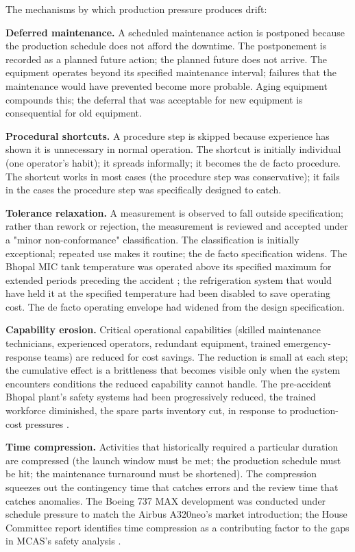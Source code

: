The mechanisms by which production pressure produces drift:

\textbf{Deferred maintenance.} A scheduled maintenance action is postponed because the production schedule does not afford the downtime. The postponement is recorded as a planned future action; the planned future does not arrive. The equipment operates beyond its specified maintenance interval; failures that the maintenance would have prevented become more probable. Aging equipment compounds this; the deferral that was acceptable for new equipment is consequential for old equipment.

\textbf{Procedural shortcuts.} A procedure step is skipped because experience has shown it is unnecessary in normal operation. The shortcut is initially individual (one operator's habit); it spreads informally; it becomes the de facto procedure. The shortcut works in most cases (the procedure step was conservative); it fails in the cases the procedure step was specifically designed to catch.

\textbf{Tolerance relaxation.} A measurement is observed to fall outside specification; rather than rework or rejection, the measurement is reviewed and accepted under a "minor non-conformance" classification. The classification is initially exceptional; repeated use makes it routine; the de facto specification widens. The Bhopal MIC tank temperature was operated above its specified maximum for extended periods preceding the accident \cite{acc:icmr-bhopal-2004}; the refrigeration system that would have held it at the specified temperature had been disabled to save operating cost. The de facto operating envelope had widened from the design specification.

\textbf{Capability erosion.} Critical operational capabilities (skilled maintenance technicians, experienced operators, redundant equipment, trained emergency-response teams) are reduced for cost savings. The reduction is small at each step; the cumulative effect is a brittleness that becomes visible only when the system encounters conditions the reduced capability cannot handle. The pre-accident Bhopal plant's safety systems had been progressively reduced, the trained workforce diminished, the spare parts inventory cut, in response to production-cost pressures \cite{acc:icmr-bhopal-2004}.

\textbf{Time compression.} Activities that historically required a particular duration are compressed (the launch window must be met; the production schedule must be hit; the maintenance turnaround must be shortened). The compression squeezes out the contingency time that catches errors and the review time that catches anomalies. The Boeing 737 MAX development was conducted under schedule pressure to match the Airbus A320neo's market introduction; the House Committee report identifies time compression as a contributing factor to the gaps in MCAS's safety analysis \cite{acc:house-737max-2020}.

